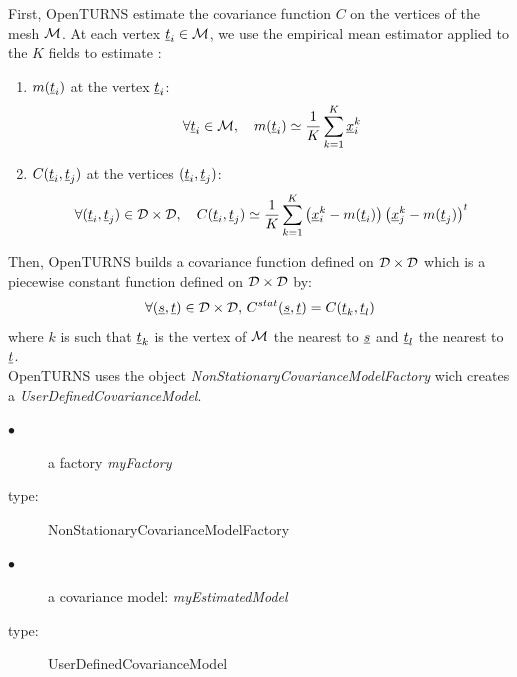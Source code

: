 First, OpenTURNS estimate the covariance function $C$ on the vertices of the mesh ${\mathcal M}$. At each vertex ${\underline{t}}_i \in {\mathcal M}$, we use the empirical mean estimator applied to the $K$ fields  to estimate :
\begin{enumerate}
\item  $m({\underline{t}}_i)$ at the vertex ${\underline{t}}_i$:
  \begin{equation}\label{meanestim}
    \displaystyle  \forall {\underline{t}}_i \in {\mathcal M}, \quad m({\underline{t}}_i) \simeq \frac{1}{K} \sum_{k=1}^{K} {\underline{x}}_i^k
  \end{equation}

\item $C({\underline{t}}_i, {\underline{t}}_j)$ at the vertices $({\underline{t}}_i, {\underline{t}}_j)$:
  \begin{equation}\label{covEstm}
    \displaystyle \forall ({\underline{t}}_i, {\underline{t}}_j) \in {\mathcal D} \times {\mathcal D}, \quad C({\underline{t}}_i, {\underline{t}}_j) \simeq \frac{1}{K} \sum_{k=1}^{K} \left( {\underline{x}}_i^k -  m({\underline{t}}_i) \right) \left( {\underline{x}}_j^k -  m({\underline{t}}_j) \right)^t
  \end{equation}
\end{enumerate}
Then,  OpenTURNS builds a covariance function defined on ${\mathcal D} \times {\mathcal D}$  which is a  piecewise constant function defined on ${\mathcal D} \times {\mathcal D}$ by:
\begin{align*}
  \forall ({\underline{s}}, {\underline{t}}) \in {\mathcal D} \times {\mathcal D}, \, C^{stat}({\underline{s}}, {\underline{t}}) =  C({\underline{t}}_k, {\underline{t}}_l)
\end{align*}
where $k$ is such that ${\underline{t}}_k$ is the  vertex of ${\mathcal M}$ the nearest to ${\underline{s}}$ and ${\underline{t}}_l$ the nearest to ${\underline{t}}$.\\


OpenTURNS uses the object \textit{NonStationaryCovarianceModelFactory} wich creates a \newline \textit{UserDefinedCovarianceModel}.\\


{
  \begin{description}
  \item[$\bullet$] a factory {\itshape myFactory}
  \item[type:]  NonStationaryCovarianceModelFactory
  \end{description}

  \begin{description}
  \item[$\bullet$] a covariance model: {\itshape  myEstimatedModel}
  \item[type:]  UserDefinedCovarianceModel
  \end{description}
}

